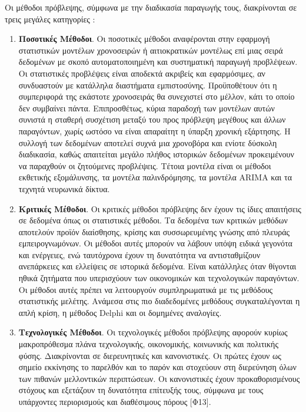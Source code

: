 \documentclass[diploma]{softlab-thesis}
\begin{document}
Οι μέθοδοι πρόβλεψης, σύμφωνα με την διαδικασία παραγωγής τους, διακρίνονται σε τρεις μεγάλες κατηγορίες :
\begin{enumerate}
\item \textbf{Ποσοτικές Μέθοδοι}. Οι ποσοτικές μέθοδοι αναφέρονται στην εφαρμογή στατιστικών μοντέλων χρονοσειρών ή αιτιοκρατικών μοντέλως επί μιας σειρά δεδομένων με σκοπό αυτοματοποιημένη και συστηματική παραγωγή προβλέψεων. Οι στατιστικές προβλέψεις είναι αποδεκτά ακριβείς και εφαρμόσιμες, αν συνδυαστούν με κατάλληλα διαστήματα εμπιστοσύνης. Προϋποθέτουν ότι η συμπεριφορά της εκάστοτε χρονοσειράς θα συνεχιστεί στο μέλλον, κάτι το οποίο δεν συμβαίνει πάντα. Επιπροσθέτως, κύρια παραδοχή των μοντέλων αυτών συνιστά η σταθερή συσχέτιση μεταξύ του προς πρόβλεψη μεγέθους και άλλων παραγόντων, χωρίς ωστόσο να είναι απαραίτητ η ύπαρξη χρονική εξάρτησης. Η συλλογή των δεδομένων αποτελεί συχνά μια χρονοβόρα και ενίοτε δύσκολη διαδικασία, καθώς απαιτείται μεγάλο πλήθος ιστορικών δεδομένων προκειμένουν να παραχθούν οι ζητούμενες προβλέψεις. Τέτοια μοντέλα είναι οι μέθοδοι εκθετικής εξομάλυνσης, τα μοντέλα παλινδρόμησης, τα μοντέλα ARIMA και τα τεχνητά νευρωνικά δίκτυα. 
\item \textbf{Κριτικές Μέθοδοι}. Οι κριτικές μέθοδοι πρόβλεψης δεν έχουν τις ίδιες απαιτήσεις σε
δεδομένα όπως οι στατιστικές μέθοδοι. Τα δεδομένα των κριτικών μεθόδων αποτελούν προϊόν διαίσθησης, κρίσης και συσσωρευμένης γνώσης από πλευράς εμπειρογνωμόνων. Οι μέθοδοι αυτές μπορούν να λάβουν υπόψη ειδικά γεγονότα και ενέργειες, ενώ ταυτόχρονα έχουν τη δυνατότητα να αντισταθμίζουν ανεπάρκειες και ελλείψεις σε ιστορικά δεδομένα. Είναι κατάλληλες όταν θίγονται ηθικά ζητήματα που υπερισχύουν των οικονομικών και τεχνολογικών παραγόντων. Οι μέθοδοι αυτές πρέπει να λειτουργούν συμπληρωματικά με τις μεθόδους στατιστικής μελέτης. Ανάμεσα στις πιο διαδεδομένες μεθόδους συγκαταλέγονται η απλή κρίση, η μέθοδος Delphi και οι δομημένες αναλογίες.
\item \textbf{Τεχνολογικές Μέθοδοι}. Οι τεχνολογικές μέθοδοι πρόβλεψης αφορούν κυρίως μακροπρόθεσμα πλάνα τεχνολογικής, οικονομικής, κοινωνικής και πολιτικής φύσης. Διακρίνονται σε διερευνητικές και κανονιστικές. Οι πρώτες έχουν ως σημείο εκκίνησης το παρελθόν και το παρόν και στοχεύουν στη διερεύνηση όλων των πιθανών μελλοντικών περιπτώσεων. Οι κανονιστικές έχουν προκαθορισμένους στόχους και εξετάζουν τη δυνατότητα επίτευξής τους, σύμφωνα με τους υπάρχοντες περιορισμούς και διαθέσιμους πόρους [Φ13].
\end{enumerate}
\end{document}
